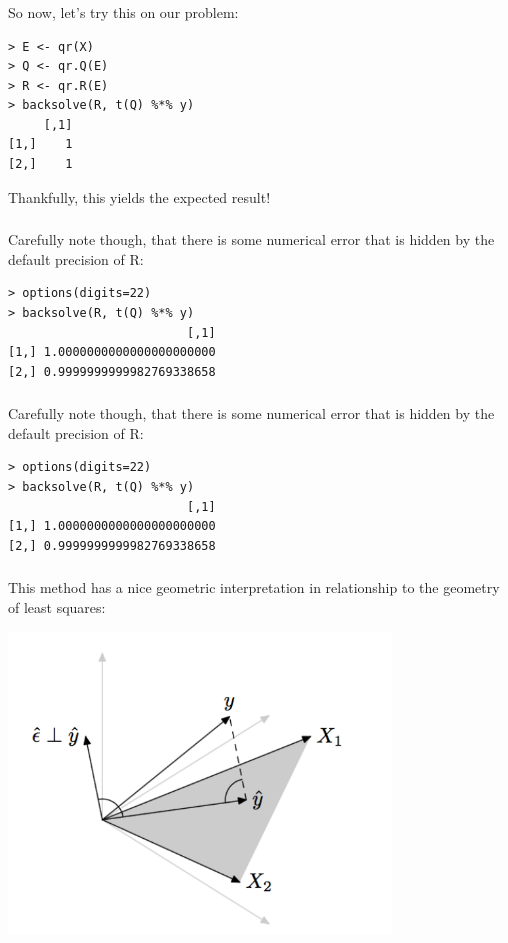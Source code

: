 \begin{frame}[fragile] \frametitle{}

So now, let's try this on our problem:
\begin{verbatim}
> E <- qr(X)
> Q <- qr.Q(E)
> R <- qr.R(E)
> backsolve(R, t(Q) %*% y)
     [,1]
[1,]    1
[2,]    1
\end{verbatim}
\pause Thankfully, this yields the expected result!

\end{frame}

\begin{frame}[fragile] \frametitle{}

Carefully note though, that there is some numerical
error that is hidden by the default precision of R:
\begin{verbatim}
> options(digits=22)
> backsolve(R, t(Q) %*% y)
                         [,1]
[1,] 1.0000000000000000000000
[2,] 0.9999999999982769338658
\end{verbatim}

\end{frame}

\begin{frame}[fragile] \frametitle{}

Carefully note though, that there is some numerical
error that is hidden by the default precision of R:
\begin{verbatim}
> options(digits=22)
> backsolve(R, t(Q) %*% y)
                         [,1]
[1,] 1.0000000000000000000000
[2,] 0.9999999999982769338658
\end{verbatim}

\end{frame}


\begin{frame}[fragile] \frametitle{}

This method has a nice geometric interpretation in relationship
to the geometry of least squares:
\pause

\begin{center}
\includegraphics[width=4in]{img/olsGeom.pdf}
\end{center}

\end{frame}

